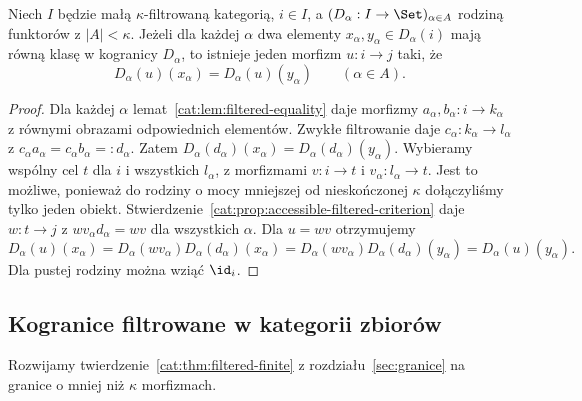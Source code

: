\begin{lemat}\label{cat:lem:accessible-simultaneous-equality}
Niech $I$ będzie małą $\kappa$-filtrowaną kategorią, $i\in I$, a $(D_\alpha:I\to\Set)_{\alpha\in A}$ rodziną funktorów z $|A|<\kappa$. Jeżeli dla każdej $\alpha$ dwa elementy $x_\alpha,y_\alpha\in D_\alpha(i)$ mają równą klasę w kogranicy $D_\alpha$, to istnieje jeden morfizm $u:i\to j$ taki, że
\[
 D_\alpha(u)(x_\alpha)=D_\alpha(u)(y_\alpha)
 \qquad(\alpha\in A).
\]
\end{lemat}
\begin{proof}
Dla każdej $\alpha$ lemat~\ref{cat:lem:filtered-equality} daje morfizmy $a_\alpha,b_\alpha:i\to k_\alpha$ z równymi obrazami odpowiednich elementów. Zwykłe filtrowanie daje $c_\alpha:k_\alpha\to l_\alpha$ z $c_\alpha a_\alpha=c_\alpha b_\alpha=:d_\alpha$. Zatem $D_\alpha(d_\alpha)(x_\alpha)=D_\alpha(d_\alpha)(y_\alpha)$. Wybieramy wspólny cel $t$ dla $i$ i wszystkich $l_\alpha$, z morfizmami $v:i\to t$ i $v_\alpha:l_\alpha\to t$. Jest to możliwe, ponieważ do rodziny o mocy mniejszej od nieskończonej $\kappa$ dołączyliśmy tylko jeden obiekt. Stwierdzenie~\ref{cat:prop:accessible-filtered-criterion} daje $w:t\to j$ z $wv_\alpha d_\alpha=wv$ dla wszystkich $\alpha$. Dla $u=wv$ otrzymujemy
\[
 D_\alpha(u)(x_\alpha)
 =D_\alpha(wv_\alpha)D_\alpha(d_\alpha)(x_\alpha)
 =D_\alpha(wv_\alpha)D_\alpha(d_\alpha)(y_\alpha)
 =D_\alpha(u)(y_\alpha).
\]
Dla pustej rodziny można wziąć $\id_i$.
\end{proof}

\subsection{Kogranice filtrowane w kategorii zbiorów}

Rozwijamy twierdzenie~\ref{cat:thm:filtered-finite} z rozdziału~\ref{sec:granice} na granice o mniej niż $\kappa$ morfizmach.

